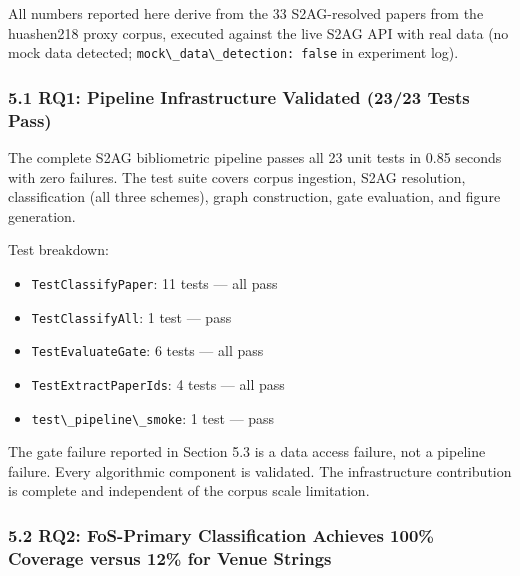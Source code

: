 
All numbers reported here derive from the 33 S2AG-resolved papers from the huashen218 proxy corpus, executed against the live S2AG API with real data (no mock data detected; \texttt{mock\textbackslash \_data\textbackslash \_detection: false} in experiment log).

\subsubsection{5.1 RQ1: Pipeline Infrastructure Validated (23/23 Tests Pass)}

The complete S2AG bibliometric pipeline passes all 23 unit tests in 0.85 seconds with zero failures. The test suite covers corpus ingestion, S2AG resolution, classification (all three schemes), graph construction, gate evaluation, and figure generation.

Test breakdown:
\begin{itemize}
\item \texttt{TestClassifyPaper}: 11 tests --- all pass
\item \texttt{TestClassifyAll}: 1 test --- pass
\item \texttt{TestEvaluateGate}: 6 tests --- all pass
\item \texttt{TestExtractPaperIds}: 4 tests --- all pass
\item \texttt{test\textbackslash \_pipeline\textbackslash \_smoke}: 1 test --- pass
\end{itemize}

The gate failure reported in Section 5.3 is a data access failure, not a pipeline failure. Every algorithmic component is validated. The infrastructure contribution is complete and independent of the corpus scale limitation.

\subsubsection{5.2 RQ2: FoS-Primary Classification Achieves 100\% Coverage versus 12\% for Venue Strings}

\begin{table}[htbp]
\centering
{}
\end{table}

